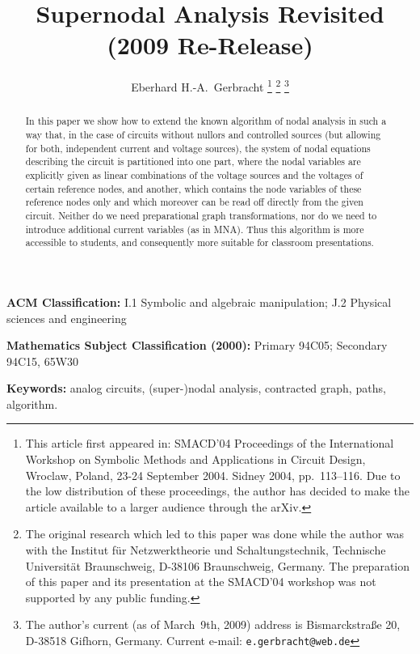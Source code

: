 \documentclass[10pt,journal,twocolumn,pagenumbers]{IEEEtran}
\begin{document}
\title{\Large Supernodal Analysis Revisited\\
{\large (2009 Re-Release)}
}

\author{{\large Eberhard H.-A.\ Gerbracht
\thanks{This article first appeared in: SMACD'04 Proceedings of the International Workshop on Symbolic Methods and Applications in Circuit Design, Wroclaw, Poland, 23-24 September 2004. Sidney 2004, pp.~113--116. Due to the low distribution of these proceedings, the author has decided to make the article available to a larger audience through the arXiv.}
\thanks{The original research which led to this paper was done while the author was with the Institut f\"ur Netz\-werk\-theorie und Schaltungstechnik, Technische Universit\"at Braunschweig, D-38106 Braunschweig, Germany. The preparation of this paper and its presentation at the SMACD'04 workshop was not supported by any public funding.}
\thanks{The author's current (as of March~9th, 2009) address is Bismarckstra\ss e 20, D-38518 Gifhorn, Germany. Current e-mail: \tt{e.gerbracht@web.de}}}}

\maketitle
\pagestyle{empty}

\bigskip

\begin{abstract}
In this paper we show how to extend the known algorithm of nodal analysis in such a way that, in the case of circuits without nullors and controlled sources (but allowing for both, independent current and voltage sources), the system of nodal equations describing the circuit is partitioned into one part, where the nodal variables are explicitly given as linear combinations of the voltage sources and the voltages of certain reference nodes, and another, which contains the node variables of these reference nodes only and which moreover can be read off directly from the given circuit. Neither do we need preparational graph transformations, nor do we need to introduce additional current variables (as in MNA). Thus this algorithm is more accessible to students, and consequently more suitable for classroom presentations.
\end{abstract}

{\small
\noindent
{\bf ACM Classification:} I.1 Symbolic and algebraic manipulation; J.2 Physical sciences and engineering
\smallskip

\noindent
{\bf Mathematics Subject Classification (2000):} Primary 94C05; Secondary 94C15, 65W30
\smallskip

\noindent
{\bf Keywords:} analog circuits, (super-)nodal analysis, contracted graph, paths, algorithm.
}
\end{document}
